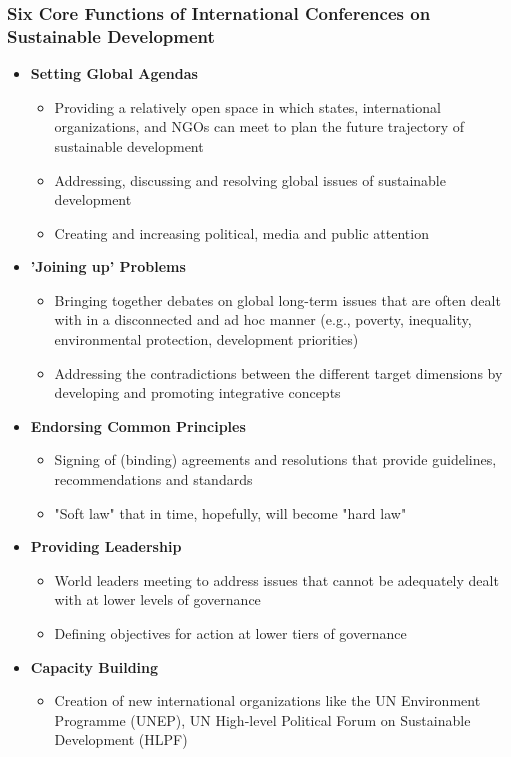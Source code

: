 \documentclass[11pt]{article}
\theoremstyle{definition}
\begin{document}
\subsubsection{Six Core Functions of International Conferences on Sustainable Development}
\begin{itemize}[noitemsep]
	\item \textbf{Setting Global Agendas}
	\begin{itemize}
		\item Providing a relatively open space in which states, international organizations, and NGOs can meet to plan the future trajectory of sustainable development
		\item Addressing, discussing and resolving global issues of sustainable development
		\item Creating and increasing political, media and public attention
	\end{itemize}
	\item \textbf{'Joining up' Problems}
	\begin{itemize}
		\item Bringing together debates on global long-term issues that are often dealt with in a disconnected and ad hoc manner (e.g., poverty, inequality, environmental protection, development priorities)
		\item Addressing the contradictions between the different target dimensions by developing and promoting integrative concepts
	\end{itemize}
	\item \textbf{Endorsing Common Principles}
	\begin{itemize}
		\item Signing of (binding) agreements and resolutions that provide guidelines, recommendations and standards
		\item "Soft law" that in time, hopefully, will become "hard law"
	\end{itemize}
	\item \textbf{Providing Leadership}
	\begin{itemize}
		\item World leaders meeting to address issues that cannot be adequately dealt with at lower levels of governance
		\item Defining objectives for action at lower tiers of governance
	\end{itemize}
	\item \textbf{Capacity Building}
	\begin{itemize}
		\item Creation of new international organizations like the UN Environment Programme (UNEP), UN High-level Political Forum on Sustainable Development (HLPF)

\end{itemize}
\end{itemize}
\end{document}
